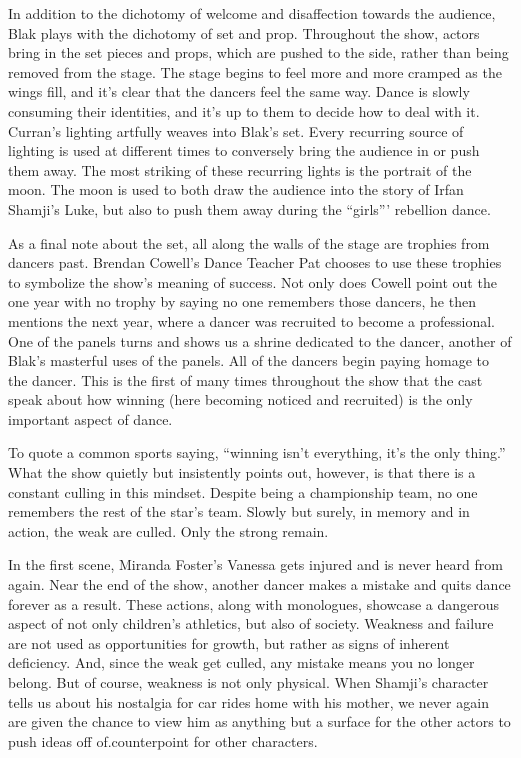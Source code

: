 \documentclass[12pt]{article}[titlepage]
\newcommand{\say}[1]{``#1''}
\newcommand{\1}{\={a}}
\newcommand{\2}{\={e}}
\newcommand{\3}{\={\i}}
\newcommand{\4}{\=o}
\newcommand{\5}{\=u}
\newcommand{\6}{\={A}}
\renewcommand{\,}{\textsuperscript{,}}
\begin{document}
In addition to the dichotomy of welcome and disaffection towards the audience, Blak plays with the dichotomy of set and prop. Throughout the show, actors bring in the set pieces and props, which are pushed to the side, rather than being removed from the stage. The stage begins to feel more and more cramped as the wings fill, and it's clear that the dancers feel the same way. Dance is slowly consuming their identities, and it's up to them to decide how to deal with it.
Curran's lighting artfully weaves into Blak's set. Every recurring source of 
lighting is used at different times to conversely bring the audience in or push them away. The most striking of these recurring lights is the portrait of the moon. The moon is used to both draw the audience into the story of Irfan Shamji's Luke, but also to push them away during the \say{girls'} rebellion dance.

As a final note about the set, all along the walls of the stage are trophies from dancers past. Brendan Cowell's Dance Teacher Pat chooses to use these trophies to symbolize the show's meaning of success. Not only does Cowell point out the one year with no trophy by saying no one remembers those dancers, he then mentions the next year, where a dancer was recruited to become a professional. One of the panels turns and shows us a shrine dedicated to the dancer, another of Blak's masterful uses of the panels. All of the dancers begin paying homage to the dancer. This is the first of many times throughout the show that the cast speak about how winning (here becoming noticed and recruited) is the only important aspect of dance.

To quote a common sports saying, \say{winning isn't everything, it's the only thing.} What the show quietly but insistently points out, however, is that there is a constant culling in this mindset. Despite being a championship team, no one remembers the rest of the star's team. Slowly but surely, in memory and in action, the weak are culled. Only the strong remain.

In the first scene, Miranda Foster's Vanessa gets injured and is never heard from again.
Near the end of the show, another dancer makes a mistake and quits dance forever as a result.
These actions, along with monologues, showcase a dangerous aspect of not only children's athletics, but also of society. Weakness and failure are not used as opportunities for growth, but rather as signs of inherent deficiency. And, since the weak get culled, any mistake means you no longer belong. But of course, weakness is not only physical. When Shamji's character tells us about his nostalgia for car rides home with his mother, we never again are given the chance to view him as anything but a surface for the other actors to push ideas off of.counterpoint for other characters.
\end{document}
